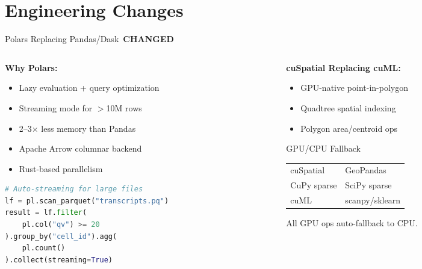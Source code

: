 \documentclass[aspectratio=169,10pt]{beamer}
\newcommand{\CHANGED}{\,{\scriptsize\colorbox{goldaccent!80!black}{\color{white}\textbf{CHANGED}}}\,}
\begin{document}
\section{Engineering Changes}

\begin{frame}[fragile]{Polars Replacing Pandas/Dask \CHANGED}

\begin{columns}[T]
\begin{column}{0.48\textwidth}
{\small
\textbf{Why Polars:}
\begin{itemize}\setlength\itemsep{1pt}
  \item Lazy evaluation + query optimization
  \item Streaming mode for $>$10M rows
  \item 2--3$\times$ less memory than Pandas
  \item Apache Arrow columnar backend
  \item Rust-based parallelism
\end{itemize}
}

\begin{lstlisting}[language=Python]
# Auto-streaming for large files
lf = pl.scan_parquet("transcripts.pq")
result = lf.filter(
    pl.col("qv") >= 20
).group_by("cell_id").agg(
    pl.count()
).collect(streaming=True)
\end{lstlisting}
\end{column}

\begin{column}{0.48\textwidth}
\textbf{cuSpatial Replacing cuML:}
{\small
\begin{itemize}\setlength\itemsep{1pt}
  \item GPU-native point-in-polygon
  \item Quadtree spatial indexing
  \item Polygon area/centroid ops
\end{itemize}
}

\vspace{0.15cm}
\begin{exampleblock}{GPU/CPU Fallback}
{\scriptsize
\begin{tabular}{@{}l@{$\;\to\;$}l@{}}
cuSpatial & GeoPandas \\
CuPy sparse & SciPy sparse \\
cuML & scanpy/sklearn \\
\end{tabular}

All GPU ops auto-fallback to CPU.
}
\end{exampleblock}
\end{column}
\end{columns}
\end{frame}
\end{document}
